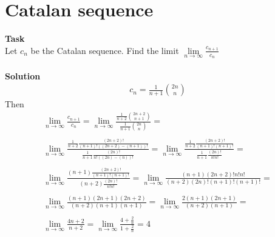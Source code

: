 \newpage		
	\section*{Catalan sequence}
	\textbf{Task}\\
	Let $c_n$ be the Catalan sequence. Find the limit $\lim\limits_{n \to \infty} \frac{c_{n+1}}{c_{n}}$\\
	\\
	\textbf{Solution}\\
	\begin{gather*}
		c_n = \frac{1}{n+1} {{2n}\choose{n}}
	\end{gather*}
	Then
	\begin{gather*}
		\lim\limits_{n \to \infty} \frac{c_{n+1}}{c_{n}} = 
		\lim\limits_{n \to \infty} \frac{\frac{1}{n+2} {{2n+2}\choose{n+1}}}{\frac{1}{n+1} {{2n}\choose{n}}} = \\ \\
		\lim\limits_{n \to \infty} \frac{\frac{1}{n+2} \frac{(2n+2)!}{(n+1)!((2n+2) - (n+1))!}}{\frac{1}{n+1} \frac{(2n)!}{n!((2n) - (n))!}} =  
		\lim\limits_{n \to \infty} \frac{\frac{1}{n+2} \frac{(2n+2)!}{(n+1)!(n+1)!}}{\frac{1}{n+1} \frac{(2n)!}{n!n!}} = \\ \\
		\lim\limits_{n \to \infty} \frac{(n+1) \frac{(2n+2)!}{(n+1)!(n+1)!}}{(n+2) \frac{(2n)!}{n!n!}} =
		\lim\limits_{n \to \infty} \frac{(n+1) (2n+2)!n!n!}{(n+2) (2n)!(n+1)!(n+1)!} = \\ \\
		\lim\limits_{n \to \infty} \frac{(n+1)(2n+1)(2n+2)}{(n+2)(n+1)(n+1)} = 
		\lim\limits_{n \to \infty} \frac{2(n+1)(2n+1)}{(n+2)(n+1)} = \\ \\
		\lim\limits_{n \to \infty} \frac{4n+2}{n+2} = 
		\lim\limits_{n \to \infty} \frac{4+\frac{2}{n}}{1+\frac{2}{n}} = 4
	\end{gather*}